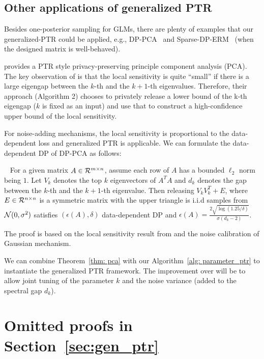 \subsection{Other applications of generalized PTR}

Besides one-posterior sampling for GLMs, there are plenty of examples that our generalized-PTR could be applied, e.g., DP-PCA~\citep{dwork2014analyze} and Sparse-DP-ERM~\citep{kifer2012private} (when the designed matrix is well-behaved).

\citep{dwork2014analyze} provides a PTR style privacy-preserving principle component analysis (PCA).
The key observation of \citep{dwork2014analyze} is that the local sensitivity is quite ``small'' if there is a large eigengap between the $k$-th and the $k+1$-th eigenvalues. Therefore, their approach (Algorithm 2) chooses to privately release a lower bound of the k-th eigengap ($k$ is fixed as an input) and use that to construct a high-confidence upper bound of the local sensitivity.

For noise-adding mechanisms, the local sensitivity is proportional to the data-dependent loss and generalized PTR is applicable. We can formulate the data-dependent DP of DP-PCA as follows:

\begin{theorem}~\label{thm: pca}
For a given matrix $A\in \mathcal{R}^{m \times n}$, assume each row of $A$ has a bounded $\ell_2$ norm being $1$.  Let $V_k$ denotes the top $k$ eigenvectors of $A^TA$ and $d_k$ denotes the gap between the $k$-th and the $k+1$-th eigenvalue. Then releasing $V_k V_k^T + E$, where $E \in \mathcal{R}^{n\times n}$ is a symmetric matrix with the upper triangle is i.i.d samples from $\mathcal{N}(0, \sigma^2)$ satisfies $(\epsilon(A), \delta)$ data-dependent DP and $\epsilon(A) = \frac{2\sqrt{\log(1.25/\delta)}}{\sigma(d_k -2)} $. 
\end{theorem}
The proof is based on the local sensitivity result from \citep{dwork2014analyze} and the noise calibration of Gaussian mechanism.


We can combine Theorem~\ref{thm: pca} with our Algorithm~\ref{alg: parameter_ptr} to instantiate the generalized PTR framework. The improvement over \citet{dwork2014analyze} will be to allow joint tuning of the parameter $k$ and the noise variance (added to the spectral gap $d_k$). 







\section{Omitted proofs in Section~\ref{sec:gen_ptr}}\label{sec: omit_gen_ptr}

